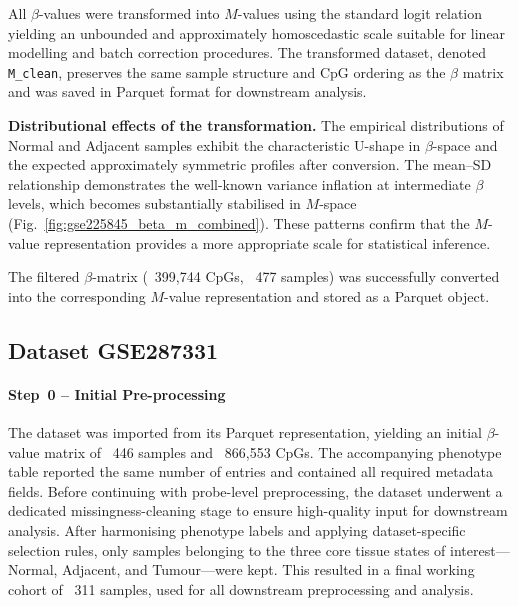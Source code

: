 \documentclass[10pt]{extarticle}
\newcommand{\good}[1]{\textcolor{teal!70!black}{\ding{51}~#1}}
\begin{document}
All $\beta$-values were transformed into $M$-values using the standard logit relation
yielding an unbounded and approximately homoscedastic scale suitable for linear modelling
and batch correction procedures.  
The transformed dataset, denoted \texttt{M\_clean}, preserves the same sample structure and CpG ordering as the $\beta$ matrix and was saved in Parquet format for downstream analysis.

\textbf{Distributional effects of the transformation.}
The empirical distributions of Normal and Adjacent samples exhibit the characteristic U-shape in $\beta$-space and the expected approximately symmetric profiles after conversion.  
The mean–SD relationship demonstrates the well-known variance inflation at intermediate $\beta$ levels, which becomes substantially stabilised in $M$-space
(Fig.~\ref{fig:gse225845_beta_m_combined}).  
These patterns confirm that the $M$-value representation provides a more appropriate scale for statistical inference.

The filtered $\beta$-matrix (\good{399{,}744 CpGs}, \good{477 samples}) was successfully converted into
the corresponding $M$-value representation and stored as a Parquet object.  


\subsection{Dataset GSE287331}
\label{subsec:gse287331_preproc}

\paragraph{Step~0 -- Initial Pre-processing}
\label{par:gse287331_step0}

The dataset was imported from its Parquet representation, yielding an initial
$\beta$-value matrix of \good{446 samples} and \good{866{,}553 CpGs}.
The accompanying phenotype table reported the same number of entries and contained
all required metadata fields.  
Before continuing with probe-level preprocessing, the dataset underwent a dedicated
missingness-cleaning stage to ensure high-quality input for downstream analysis.
After harmonising phenotype labels and applying dataset-specific selection rules, only samples belonging to the three core tissue states of interest—Normal, Adjacent, and Tumour—were kept.
This resulted in a final working cohort of \good{311 samples}, used for all downstream preprocessing and analysis.
\end{document}
